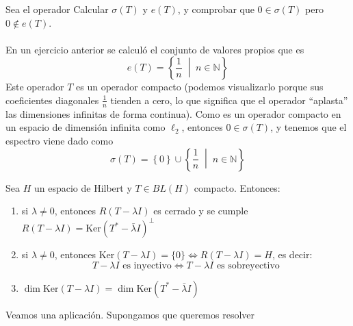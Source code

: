 \begin{ejercicio}
    Sea el operador 
    Calcular $\sigma(T)$ y $e(T)$, y comprobar que $0 \in \sigma(T)$ pero $0 \notin e(T)$. \\ \\
    \noindent
    En un ejercicio anterior se calculó el conjunto de valores propios que es
    \begin{equation*}
        e(T) = \left\{ \frac{1}{n} \;\middle|\; n \in \mathbb{N} \right\}
    \end{equation*}
    Este operador $T$ es un operador compacto (podemos visualizarlo porque sus coeficientes diagonales $\frac{1}{n}$ tienden a cero, lo que significa que el operador ``aplasta'' las dimensiones infinitas de forma continua). Como es un operador compacto en un espacio de dimensión infinita como $\ell_2$, entonces $0 \in \sigma(T)$, y tenemos que el espectro viene dado como 
    \begin{equation*}
        \sigma(T) =\left\{0\right\} \cup \left\{ \frac{1}{n} \;\middle|\; n \in \mathbb{N} \right\}
    \end{equation*}

\end{ejercicio}

\begin{teo} \label{teo:fredholm}
    Sea $H$ un espacio de Hilbert y $T \in BL(H)$ compacto. Entonces:
    \begin{enumerate}
        \item[a)] si $\lambda \neq 0$, entonces $R(T - \lambda I)$ es cerrado y se cumple $R(T - \lambda I) = \text{Ker}(T^* - \bar{\lambda} I)^\perp$
        \item[b)] si $\lambda \neq 0$, entonces $\text{Ker}(T - \lambda I) = \{0\} \iff R(T - \lambda I) = H$, es decir:
        \[ T - \lambda I \text{ es inyectivo} \iff T - \lambda I \text{ es sobreyectivo} \]
        \item[c)] $\dim \text{Ker}(T - \lambda I) = \dim \text{Ker}(T^* - \bar{\lambda} I)$
    \end{enumerate}
\end{teo}

\noindent 
Veamos una aplicación. Supongamos que queremos resolver 

